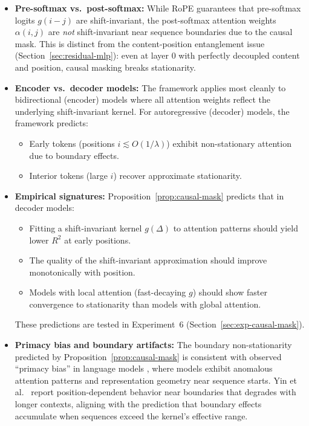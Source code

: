 \documentclass[11pt]{article}
\theoremstyle{definition}
\begin{document}
\begin{itemize}
    \item \textbf{Pre-softmax vs.\ post-softmax:} While RoPE guarantees that pre-softmax logits $g(i-j)$ are shift-invariant, the post-softmax attention weights $\alpha(i,j)$ are \emph{not} shift-invariant near sequence boundaries due to the causal mask. This is distinct from the content-position entanglement issue (Section~\ref{sec:residual-mlp}): even at layer 0 with perfectly decoupled content and position, causal masking breaks stationarity.

    \item \textbf{Encoder vs.\ decoder models:} The framework applies most cleanly to bidirectional (encoder) models where all attention weights reflect the underlying shift-invariant kernel. For autoregressive (decoder) models, the framework predicts:
    \begin{itemize}
        \item Early tokens (positions $i \lesssim O(1/\lambda)$) exhibit non-stationary attention due to boundary effects.
        \item Interior tokens (large $i$) recover approximate stationarity.
    \end{itemize}

    \item \textbf{Empirical signatures:} Proposition~\ref{prop:causal-mask} predicts that in decoder models:
    \begin{itemize}
        \item Fitting a shift-invariant kernel $g(\Delta)$ to attention patterns should yield lower $R^2$ at early positions.
        \item The quality of the shift-invariant approximation should improve monotonically with position.
        \item Models with local attention (fast-decaying $g$) should show faster convergence to stationarity than models with global attention.
    \end{itemize}
    These predictions are tested in Experiment~6 (Section~\ref{sec:exp-causal-mask}).

    \item \textbf{Primacy bias and boundary artifacts:} The boundary non-stationarity predicted by Proposition~\ref{prop:causal-mask} is consistent with observed ``primacy bias'' in language models \cite{haviv2022nopos}, where models exhibit anomalous attention patterns and representation geometry near sequence starts. Yin et al.\ \cite{yin2024stablemask} report position-dependent behavior near boundaries that degrades with longer contexts, aligning with the prediction that boundary effects accumulate when sequences exceed the kernel's effective range.
\end{itemize}
\end{document}
